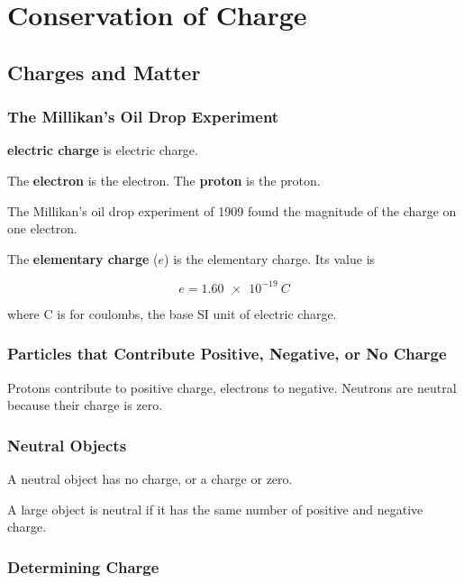\documentclass[dvipsnames]{article}
\newif\ifShowUnitIX                              %
\begin{document}
\fi

\clearpage


\section{Conservation of Charge}

\ifShowUnitIX

\subsection{Charges and Matter}

\subsubsection*{The Millikan's Oil Drop Experiment}

\textbf{\Gls{electric charge}} is \glsdesc{electric charge}.

The \textbf{\gls{electron}} is the \glsdesc{electron}. The \textbf{\gls{proton}} is the \glsdesc{proton}.

The Millikan's oil drop experiment of 1909 found the magnitude of the charge on one electron. 

The \textbf{\gls{elementary charge}} ($e$) is the \glsdesc{elementary charge}. Its value is

\begin{equation*}
    e = \SI{1.60e-19}{C}
\end{equation*}

where C is for coulombs, the base SI unit of electric charge.

\subsubsection{Particles that Contribute Positive, Negative, or No Charge}

Protons contribute to positive charge, electrons to negative. Neutrons are neutral because their charge is zero. 

\subsubsection{Neutral Objects}

A neutral object has no charge, or a charge or zero.

A large object is neutral if it has the same number of positive and negative charge.

\subsubsection{Determining Charge}
\end{document}
